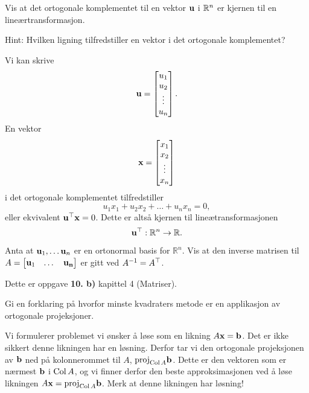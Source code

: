 \begin{oppgave}
Vis at det ortogonale komplementet til en vektor $\mathbf{u}$ i $\mathbb{R}^n$
er kjernen til en lineærtransformasjon.

\noindent
Hint: Hvilken ligning tilfredstiller en vektor i det ortogonale komplementet?
\end{oppgave}

\begin{losning}
Vi kan skrive
\[
\mathbf{u}=\begin{bmatrix}
u_1\\
u_2\\
\vdots\\
u_n\\
\end{bmatrix}.
\]
En vektor
\[
\mathbf{x}=\begin{bmatrix}
x_1\\
x_2\\
\vdots\\
x_n\\
\end{bmatrix}
\]
i det ortogonale komplementet tilfredstiller
\[
u_1x_1+u_2x_2+\dots +u_nx_n=0,
\]
eller ekvivalent $\mathbf{u}^\top \mathbf{x}=0$.
Dette er altså kjernen til lineætransformasjonen
\[
\mathbf{u}^\top:\mathbb{R}^n\rightarrow \mathbb{R}.
\]
\end{losning}
\begin{oppgave}
Anta at $\mathbf{u}_1,\dots \mathbf{u}_n$ er en ortonormal basis for $\mathbb{R}^n$. Vis at den inverse matrisen til $A=\begin{bmatrix}
\mathbf{u}_1 & \dots & \mathbf{u_n}
\end{bmatrix}$ er gitt ved $A^{-1}=A^\top$.
\end{oppgave}

\begin{losning}
Dette er oppgave \textbf{10. b)} kapittel 4 (Matriser).
\end{losning}

\begin{oppgave}
Gi en forklaring på hvorfor minste kvadraters metode er en applikasjon av ortogonale projeksjoner.
\end{oppgave}

\begin{losning}
Vi formulerer problemet vi ønsker å løse som en likning $A\mathbf{x}=\mathbf{b}$. Det er ikke sikkert denne likningen har en løsning. Derfor tar vi den ortogonale projeksjonen av $\mathbf{b}$ ned på kolonnerommet til $A$, $\text{proj}_{\operatorname{Col} A}\mathbf{b}$. Dette er den vektoren som er nærmest $\mathbf{b}$ i $\operatorname{Col} A$, og vi finner derfor den beste approksimasjonen ved å løse likningen $A\mathbf{x}=\text{proj}_{\operatorname{Col} A}\mathbf{b}$. Merk at denne likningen har løsning!
\end{losning}

